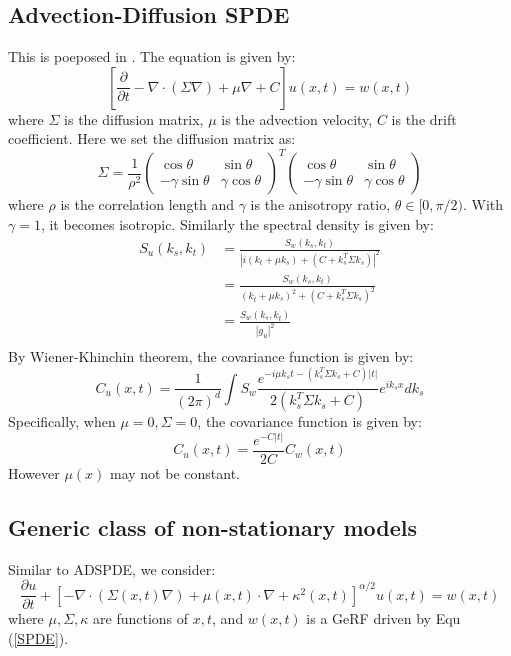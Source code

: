\documentclass{article}
\begin{document}
\subsection{Advection-Diffusion SPDE}
This is poeposed in \cite{sigrist2015stochastic}. The equation is given by:
\begin{equation}
	\left[\frac{\partial}{\partial t} - \nabla \cdot (\Sigma \nabla)+\mu \nabla + C\right]u(x,t) = w(x,t)
\end{equation}
where $\Sigma$ is the diffusion matrix, $\mu$ is the advection velocity, $C$ is the drift coefficient.
Here we set the diffusion matrix as:
\begin{equation}
	\Sigma = \frac{1}{\rho^2}\begin{pmatrix}
		\cos\theta & \sin\theta \\
		-\gamma\sin\theta & \gamma\cos\theta
	\end{pmatrix}^T\begin{pmatrix}
		\cos\theta & \sin\theta \\
		-\gamma\sin\theta & \gamma\cos\theta
	\end{pmatrix}
\end{equation}
where $\rho$ is the correlation length and $\gamma$ is the anisotropy ratio, $\theta\in [0, \pi/2)$. With $\gamma = 1$, it becomes isotropic.
Similarly the spectral density is given by:
\begin{equation}
	\begin{aligned}
		S_u(k_s, k_t) &= \frac{S_w(k_s, k_t)}{\left|i(k_t + \mu k_s) + (C + k_s^T\Sigma k_s)\right|^2}\\
		&= \frac{S_w(k_s, k_t)}{(k_t + \mu k_s)^2 + (C + k_s^T\Sigma k_s)^2}\\
		&= \frac{S_w(k_s, k_t)}{\left|g_u\right|^2}\\
	\end{aligned}
\end{equation}
By Wiener-Khinchin theorem, the covariance function is given by:
\begin{equation}
	C_u(x, t) = \frac{1}{(2\pi)^{d}}\int S_w\frac{e^{-i\mu k_s t-(k_s^T\Sigma k_s + C)|t|}}{2(k_s^T\Sigma k_s + C)}e^{ik_s x}dk_s
\end{equation}
Specifically, when $\mu = 0, \Sigma = 0$, the covariance function is given by:
\begin{equation}
	C_u(x, t) = \frac{e^{-C|t|}}{2C}C_w(x, t)
\end{equation}
However $\mu(x)$ may not be constant.

\subsection{Generic class of non-stationary models}
Similar to ADSPDE, we consider:
\begin{equation}
	\frac{\partial u}{\partial t} + \left[ - \nabla \cdot (\Sigma(x, t) \nabla)+\mu(x, t)\cdot \nabla + \kappa^2(x, t)\right]^{\alpha/2}u(x,t) = w(x,t)
\end{equation}
where $\mu, \Sigma, \kappa$ are functions of $x, t$, and $w(x, t)$ is a GeRF driven by Equ (\ref{SPDE}).
\end{document}
